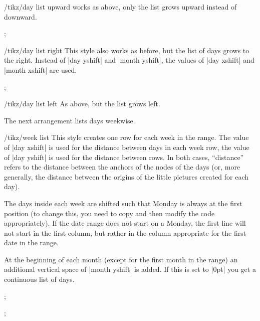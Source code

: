 \begin{stylekey}{/tikz/day list upward}
  works as above, only the list grows upward instead of downward.
\begin{codeexample}[]
\tikz
  \calendar [dates=2000-01-28 to 2000-02-03,
             day list upward,month yshift=1em];
\end{codeexample}
\end{stylekey}

\begin{stylekey}{/tikz/day list right}
  This style also works as before, but the list of days grows to the
  right. Instead of |day yshift| and |month yshift|, the values of
  |day xshift| and |month xshift| are used.
\begin{codeexample}[]
\tikz
  \calendar [dates=2000-01-28 to 2000-02-03,
             day list right,month xshift=1em];
\end{codeexample}
\end{stylekey}

\begin{stylekey}{/tikz/day list left}
  As above, but the list grows left.
\end{stylekey}

The next arrangement lists days weekwise.

\begin{stylekey}{/tikz/week list}
  This style creates one row for each week in the range. The value
  of |day xshift| is used for the distance between days in each week
  row, the value of |day yshift| is used for the distance between
  rows. In both cases, ``distance''  refers to the distance between
  the anchors of the nodes of the days (or, more generally, the
  distance between the origins of the little pictures created for each
  day).

  The days inside each week are shifted such that Monday is always
  at the first position (to change this, you need to copy and then
  modify the code appropriately). If the date range does not start on
  a Monday, the first line will not start in the first column, but
  rather in the column appropriate for the first date in the range.

  At the beginning of each month (except for the first month in the
  range) an additional vertical space of |month yshift| is added. If
  this is set to |0pt| you get a continuous list of days.
\begin{codeexample}[]
\tikz
  \calendar [dates=2000-01-01 to 2000-02-last,week list];
\end{codeexample}
\begin{codeexample}[]
\tikz
  \calendar [dates=2000-01-01 to 2000-02-last,week list,
             month yshift=0pt];
\end{codeexample}
\end{stylekey}

